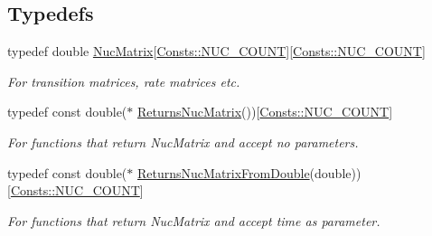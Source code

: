 \subsection*{Typedefs}
\begin{DoxyCompactItemize}
\item 
\mbox{\label{namespaceretrocombinator_a47bcd6dd938a6f8e34b0996d940f81ef}} 
typedef double \hyperlink{namespaceretrocombinator_a47bcd6dd938a6f8e34b0996d940f81ef}{Nuc\+Matrix}\mbox{[}\hyperlink{namespaceretrocombinator_1_1Consts_a274e9195aeee16a2bc05c6c2d13da17da4267c64ef80aa3023d8e808832e04b4e}{Consts\+::\+N\+U\+C\+\_\+\+C\+O\+U\+NT}\mbox{]}\mbox{[}\hyperlink{namespaceretrocombinator_1_1Consts_a274e9195aeee16a2bc05c6c2d13da17da4267c64ef80aa3023d8e808832e04b4e}{Consts\+::\+N\+U\+C\+\_\+\+C\+O\+U\+NT}\mbox{]}
\begin{DoxyCompactList}\small\item\em For transition matrices, rate matrices etc. \end{DoxyCompactList}\item 
\mbox{\label{namespaceretrocombinator_a9556122795cc5d0307ae7d2f4e5c36ef}} 
typedef const double($\ast$ \hyperlink{namespaceretrocombinator_a9556122795cc5d0307ae7d2f4e5c36ef}{Returns\+Nuc\+Matrix}())\mbox{[}\hyperlink{namespaceretrocombinator_1_1Consts_a274e9195aeee16a2bc05c6c2d13da17da4267c64ef80aa3023d8e808832e04b4e}{Consts\+::\+N\+U\+C\+\_\+\+C\+O\+U\+NT}\mbox{]}
\begin{DoxyCompactList}\small\item\em For functions that return Nuc\+Matrix and accept no parameters. \end{DoxyCompactList}\item 
\mbox{\label{namespaceretrocombinator_a8c467e58c8e3e2f58b916ac063c671b1}} 
typedef const double($\ast$ \hyperlink{namespaceretrocombinator_a8c467e58c8e3e2f58b916ac063c671b1}{Returns\+Nuc\+Matrix\+From\+Double}(double))\mbox{[}\hyperlink{namespaceretrocombinator_1_1Consts_a274e9195aeee16a2bc05c6c2d13da17da4267c64ef80aa3023d8e808832e04b4e}{Consts\+::\+N\+U\+C\+\_\+\+C\+O\+U\+NT}\mbox{]}
\begin{DoxyCompactList}\small\item\em For functions that return Nuc\+Matrix and accept time as parameter. \end{DoxyCompactList}\item 

\end{DoxyCompactItemize}
